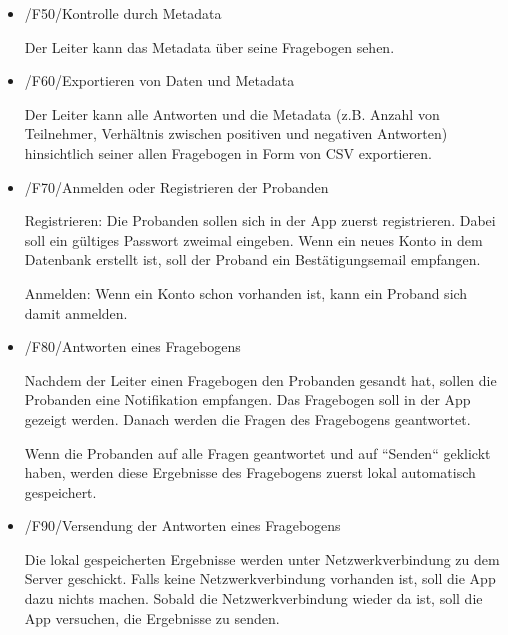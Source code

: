 \documentclass[a4paper]{scrreprt}
\begin{document}
        \begin{itemize}
            \item /F50/Kontrolle durch Metadata
            	\par Der Leiter kann das Metadata über seine Fragebogen sehen.

        \end{itemize}
        \begin{itemize}
            \item /F60/Exportieren von Daten und Metadata
            	\par Der Leiter kann alle Antworten und die Metadata (z.B. Anzahl von Teilnehmer, Verhältnis zwischen positiven und negativen Antworten) hinsichtlich seiner allen Fragebogen in Form von CSV exportieren.

        \end{itemize}
        \begin{itemize}
            \item /F70/Anmelden oder Registrieren der Probanden

            	\par Registrieren: Die Probanden sollen sich in der App zuerst registrieren. Dabei soll ein gültiges Passwort zweimal eingeben. Wenn ein neues Konto in dem Datenbank erstellt ist, soll der Proband ein Bestätigungsemail empfangen.
                \par Anmelden: Wenn ein Konto schon vorhanden ist, kann ein Proband sich damit anmelden.



        \end{itemize}
        \begin{itemize}
            \item /F80/Antworten eines Fragebogens

            	\par Nachdem der Leiter einen Fragebogen den Probanden gesandt hat, sollen die Probanden eine Notifikation empfangen. Das Fragebogen soll in der App gezeigt werden. Danach werden die Fragen des Fragebogens geantwortet.
                \par
                Wenn die Probanden auf alle Fragen geantwortet und auf “Senden“ geklickt haben, werden diese Ergebnisse des Fragebogens zuerst lokal automatisch gespeichert. 


        \end{itemize}
        \begin{itemize}
            \item /F90/Versendung der Antworten eines Fragebogens

            	\par Die lokal gespeicherten Ergebnisse werden unter Netzwerkverbindung zu dem Server geschickt. Falls keine Netzwerkverbindung vorhanden ist, soll die App dazu nichts machen. Sobald die Netzwerkverbindung wieder da ist, soll die App versuchen, die Ergebnisse zu senden.


        \end{itemize}
 
\end{document}
